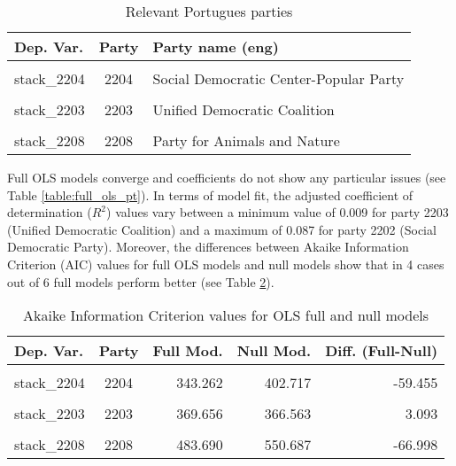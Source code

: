 \documentclass[
]{article}
\begin{document}
\begin{table}[!h]

\caption{\label{tab:unnamed-chunk-143}Relevant Portugues parties \label{table:relprty_tab_pt}}
\centering
\begin{tabular}[t]{lcl}
\toprule
Dep. Var. & Party & Party name (eng)\\
\midrule
\cellcolor{gray!6}{stack\_2202} & \cellcolor{gray!6}{2202} & \cellcolor{gray!6}{Social Democratic Party}\\
stack\_2204 & 2204 & Social Democratic Center-Popular Party\\
\cellcolor{gray!6}{stack\_2201} & \cellcolor{gray!6}{2201} & \cellcolor{gray!6}{Socialist Party}\\
stack\_2203 & 2203 & Unified Democratic Coalition\\
\cellcolor{gray!6}{stack\_2206} & \cellcolor{gray!6}{2206} & \cellcolor{gray!6}{Left Bloc}\\
\addlinespace
stack\_2208 & 2208 & Party for Animals and Nature\\
\bottomrule
\end{tabular}
\end{table}

Full OLS models converge and coefficients do not show any particular issues (see Table
\ref{table:full_ols_pt}).
In terms of model fit, the adjusted coefficient of determination (\(R^2\)) values vary between
a minimum value of 0.009
for party 2203
(Unified Democratic Coalition)
and a maximum of 0.087
for party 2202
(Social Democratic Party).
Moreover, the differences between Akaike Information Criterion (AIC) values for full OLS models and null
models show that in 4 cases out of 6 full models perform better (see Table
\ref{table:ols_aic_pt}).

\begin{table}[!h]

\caption{\label{tab:unnamed-chunk-144}Akaike Information Criterion values for OLS full and null models 
        \label{table:ols_aic_pt}}
\centering
\begin{tabular}[t]{lcrrr}
\toprule
Dep. Var. & Party & Full Mod. & Null Mod. & Diff. (Full-Null)\\
\midrule
\cellcolor{gray!6}{stack\_2202} & \cellcolor{gray!6}{2202} & \cellcolor{gray!6}{482.135} & \cellcolor{gray!6}{553.585} & \cellcolor{gray!6}{-71.451}\\
stack\_2204 & 2204 & 343.262 & 402.717 & -59.455\\
\cellcolor{gray!6}{stack\_2201} & \cellcolor{gray!6}{2201} & \cellcolor{gray!6}{608.395} & \cellcolor{gray!6}{624.614} & \cellcolor{gray!6}{-16.219}\\
stack\_2203 & 2203 & 369.656 & 366.563 & 3.093\\
\cellcolor{gray!6}{stack\_2206} & \cellcolor{gray!6}{2206} & \cellcolor{gray!6}{546.537} & \cellcolor{gray!6}{546.208} & \cellcolor{gray!6}{0.328}\\
\addlinespace
stack\_2208 & 2208 & 483.690 & 550.687 & -66.998\\
\bottomrule
\end{tabular}
\end{table}
\end{document}
